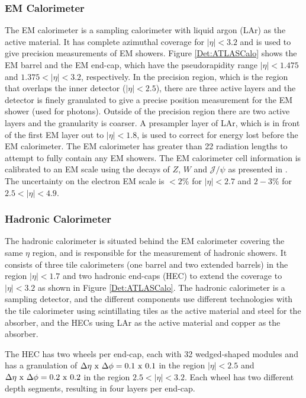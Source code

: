 \subsubsection{EM Calorimeter}

The EM calorimeter is a sampling calorimeter with liquid argon (LAr) as the active material. 
It has complete azimuthal coverage for $|\eta|<3.2$ and is used to give precision measurements of EM showers.
Figure \ref{Det:ATLASCalo} shows the EM barrel and the EM end-cap, which have the pseudorapidity range $|\eta|<1.475$ and $1.375<|\eta|<3.2$, respectively.
In the precision region,  which is the region that overlaps the inner detector ($|\eta|<2.5$), there are three active layers and the detector is finely granulated to give a precise position measurement for the EM shower (used for photons).
Outside of the precision region there are two active layers and the granularity is coarser.
A presampler layer of LAr, which is in front of the first EM layer out to $|\eta|<1.8$, is used to correct for energy lost before the EM calorimeter. 
The EM calorimeter has greater than 22 radiation lengths to attempt to fully contain any EM showers.
The EM calorimeter cell information is calibrated to an EM scale using the decays of $Z$, $W$ and $\mathcal{J}/\psi$ as presented in \cite{ref:ZeeCalib}. 
The uncertainty on the electron EM scale is $<2\%$ for $|\eta|<2.7$ and $2-3\%$ for $2.5<|\eta|<4.9$. 

\subsubsection{Hadronic Calorimeter}



The hadronic calorimeter is situated behind the EM calorimeter covering the same $\eta$ region, and is responsible for the measurement of hadronic showers. 
It consists of three tile calorimeters (one barrel and two extended barrels) in the region $|\eta|<1.7$ and two hadronic end-caps (HEC) to extend the coverage to $|\eta|<3.2$ as shown in Figure \ref{Det:ATLASCalo}.
The hadronic calorimeter is a sampling detector, and the different components use different technologies with the tile calorimeter using  scintillating tiles as the active material and steel for the absorber, and the HECs using LAr as the active material and copper as the absorber.

The HEC has two wheels per end-cap, each with 32 wedged-shaped modules and has a granulation of $\Delta\eta~\rm{x}~\Delta\phi = 0.1~\rm{x}~0.1$ in the region $|\eta|<2.5$ and $\Delta\eta~\rm{x}~\Delta\phi = 0.2~\rm{x}~0.2$ in the region $2.5<|\eta|<3.2$.
Each wheel has two different depth segments, resulting in four layers per end-cap.

